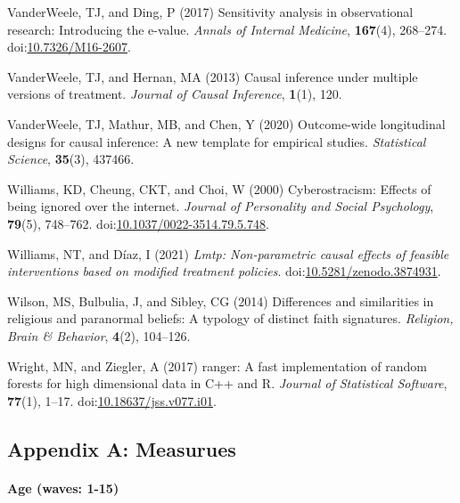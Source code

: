 \documentclass[
  singlecolumn]{article}
\let\oldparagraph\paragraph
\renewcommand{\paragraph}[1]{\oldparagraph{#1}\mbox{}}
\newlength{\cslhangindent}
\newenvironment{CSLReferences}[2] %
 {\begin{list}{}{%
  \setlength{\itemindent}{0pt}
  \setlength{\leftmargin}{0pt}
  \setlength{\parsep}{0pt}
  \ifodd #1
   \setlength{\leftmargin}{\cslhangindent}
   \setlength{\itemindent}{-1\cslhangindent}
  \fi
  \setlength{\itemsep}{#2\baselineskip}}}
 {\end{list}}
\begin{document}
\begin{CSLReferences}{1}{0}
VanderWeele, TJ, and Ding, P (2017) Sensitivity analysis in
observational research: Introducing the e-value. \emph{Annals of
Internal Medicine}, \textbf{167}(4), 268--274.
doi:\href{https://doi.org/10.7326/M16-2607}{10.7326/M16-2607}.

VanderWeele, TJ, and Hernan, MA (2013) Causal inference under multiple
versions of treatment. \emph{Journal of Causal Inference},
\textbf{1}(1), 120.

VanderWeele, TJ, Mathur, MB, and Chen, Y (2020) Outcome-wide
longitudinal designs for causal inference: A new template for empirical
studies. \emph{Statistical Science}, \textbf{35}(3), 437466.

Williams, KD, Cheung, CKT, and Choi, W (2000) Cyberostracism: Effects of
being ignored over the internet. \emph{Journal of Personality and Social
Psychology}, \textbf{79}(5), 748--762.
doi:\href{https://doi.org/10.1037/0022-3514.79.5.748}{10.1037/0022-3514.79.5.748}.

Williams, NT, and Díaz, I (2021) \emph{Lmtp: Non-parametric causal
effects of feasible interventions based on modified treatment policies}.
doi:\href{https://doi.org/10.5281/zenodo.3874931}{10.5281/zenodo.3874931}.

Wilson, MS, Bulbulia, J, and Sibley, CG (2014) Differences and
similarities in religious and paranormal beliefs: A typology of distinct
faith signatures. \emph{Religion, Brain \& Behavior}, \textbf{4}(2),
104--126.

Wright, MN, and Ziegler, A (2017) {ranger}: A fast implementation of
random forests for high dimensional data in {C++} and {R}. \emph{Journal
of Statistical Software}, \textbf{77}(1), 1--17.
doi:\href{https://doi.org/10.18637/jss.v077.i01}{10.18637/jss.v077.i01}.

\end{CSLReferences}

\newpage{}

\subsection{Appendix A: Measurues}\label{appendix-measures}

\paragraph{Age (waves: 1-15)}\label{age-waves-1-15}
\end{document}
